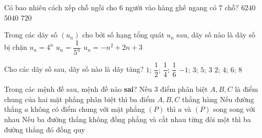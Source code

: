 \begin{ex}%
Có bao nhiêu cách xếp chỗ ngồi cho $6$ người vào hàng ghế ngang có $7$ chỗ?
{$6240$}
{\True $5040$}
{$720$}
\end{ex}

\begin{ex}%
Trong các dãy số $(u_n)$ cho bởi số hạng tổng quát $u_n$ sau, dãy số nào là dãy số bị chặn
{$u_n=4^n$}
{\True $u_n=\dfrac{1}{5^n}$}
{$u_n=-n^2+2n+3$}
\end{ex}

\begin{ex}%
Cho các dãy số sau, dãy số nào là dãy tăng?
{$1$; $\dfrac{1}{2}$; $\dfrac{1}{4}$; $\dfrac{1}{6}$}
{$-1$; $3$; $5$; $3$}
{\True $2$; $4$; $6$; $8$}
\end{ex}

\begin{ex}%
Trong các mệnh đề sau, mệnh đề nào \textbf{sai}?
{Nếu $3$ điểm phân biệt $A,B,C$ là điểm chung của hai mặt phẳng phân biệt thì ba điểm $A,B,C$ thẳng hàng}
{Nếu đường thẳng $a$ không có điểm chung với mặt phẳng $(P)$ thì $a$ và $(P)$ song song với nhau}
{Nếu ba đường thẳng không đồng phẳng và cắt nhau từng đôi một thì ba đường thẳng đó đồng quy}
\end{ex}

